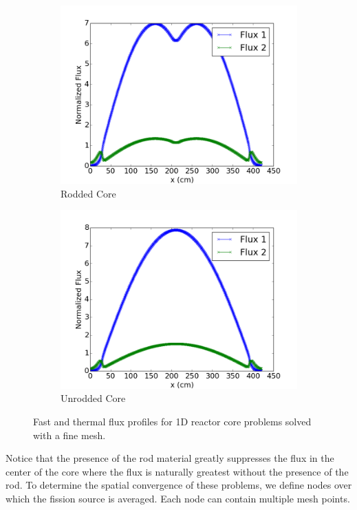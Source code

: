 \documentclass[12pt]{report}
\begin{document}
		\begin{figure}[ht]
			\centering
			\begin{subfigure}{.5\textwidth}
				\centering
				\includegraphics[width=.9\linewidth]{rod_flux.png}
				\caption{Rodded Core}
				\label{fig::rod_flux}
			\end{subfigure}%
			\begin{subfigure}{.5\textwidth}
				\centering
				\includegraphics[width=.9\linewidth]{urod_flux.png}
				\caption{Unrodded Core}
				\label{fig::urod_flux}
			\end{subfigure}
			\caption{Fast and thermal flux profiles for 1D reactor core problems solved with a fine mesh.}
			\label{fig::flux_profiles}
		\end{figure}	
	
	Notice that the presence of the rod material greatly suppresses the flux in the center of the core where the flux is naturally greatest without the presence of the rod. To determine the spatial convergence of these problems, we define nodes over which the fission source is averaged. Each node can contain multiple mesh points. 
	
\end{document}
